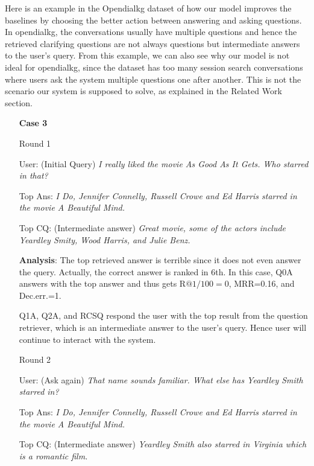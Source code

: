 \documentclass[format=acmsmall, review=False, screen=true]{acmart}
\begin{document}
Here is an example in the Opendialkg dataset of how our model improves the baselines by choosing the better action between answering and asking questions. In opendialkg, the conversations usually have multiple questions and hence the retrieved clarifying questions are not always questions but intermediate answers to the user's query. From this example, we can also see why our model is not ideal for opendialkg, since the dataset has too many session search conversations where users ask the system multiple questions one after another. This is not the scenario our system is supposed to solve, as explained in the Related Work section.

\begin{itemize}
    \item[\textbf{Case 3}]
    \item[Round 1]
    \item[User:] (Initial Query) \textit{I really liked the movie As Good As It Gets. Who starred in that?}
    
    \item[Top Ans:] \textit{I Do, Jennifer Connelly, Russell Crowe and Ed Harris starred in the movie A Beautiful Mind.}
    
    \item[Top CQ:] (Intermediate answer) \textit{Great movie, some of the actors include Yeardley Smity, Wood Harris, and Julie Benz.}

    \item[\textbf{Analysis}:]
    The top retrieved answer is terrible since it does not even answer the query. Actually, the correct answer is ranked in 6th. In this case, Q0A answers with the top answer and thus gets $\text{R@1/100}=0$, MRR=0.16, and Dec.err.=1. 
    
    Q1A, Q2A, and RCSQ respond the user with the top result from the question retriever, which is an intermediate answer to the user's query. Hence user will continue to interact with the system.
    
    \item[Round 2]
    \item[User:] (Ask again) \textit{That name sounds familiar. What else has Yeardley Smith starred in?}
    
    \item[Top Ans:] \textit{I Do, Jennifer Connelly, Russell Crowe and Ed Harris starred in the movie A Beautiful Mind.}
    
    \item[Top CQ:] (Intermediate answer)  \textit{Yeardley Smith also starred in Virginia which is a romantic film.}
    

\end{itemize}
\end{document}
